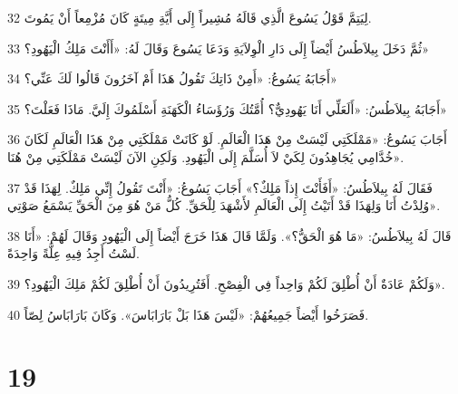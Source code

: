 \par 32 لِيَتِمَّ قَوْلُ يَسُوعَ الَّذِي قَالَهُ مُشِيراً إِلَى أَيَّةِ مِيتَةٍ كَانَ مُزْمِعاً أَنْ يَمُوتَ.
\par 33 ثُمَّ دَخَلَ بِيلاَطُسُ أَيْضاً إِلَى دَارِ الْوِلاَيَةِ وَدَعَا يَسُوعَ وَقَالَ لَهُ: «أَأَنْتَ مَلِكُ الْيَهُودِ؟»
\par 34 أَجَابَهُ يَسُوعُ: «أَمِنْ ذَاتِكَ تَقُولُ هَذَا أَمْ آخَرُونَ قَالُوا لَكَ عَنِّي؟»
\par 35 أَجَابَهُ بِيلاَطُسُ: «أَلَعَلِّي أَنَا يَهُودِيٌّ؟ أُمَّتُكَ وَرُؤَسَاءُ الْكَهَنَةِ أَسْلَمُوكَ إِلَيَّ. مَاذَا فَعَلْتَ؟»
\par 36 أَجَابَ يَسُوعُ: «مَمْلَكَتِي لَيْسَتْ مِنْ هَذَا الْعَالَمِ. لَوْ كَانَتْ مَمْلَكَتِي مِنْ هَذَا الْعَالَمِ لَكَانَ خُدَّامِي يُجَاهِدُونَ لِكَيْ لاَ أُسَلَّمَ إِلَى الْيَهُودِ. وَلَكِنِ الآنَ لَيْسَتْ مَمْلَكَتِي مِنْ هُنَا».
\par 37 فَقَالَ لَهُ بِيلاَطُسُ: «أَفَأَنْتَ إِذاً مَلِكٌ؟» أَجَابَ يَسُوعُ: «أَنْتَ تَقُولُ إِنِّي مَلِكٌ. لِهَذَا قَدْ وُلِدْتُ أَنَا وَلِهَذَا قَدْ أَتَيْتُ إِلَى الْعَالَمِ لأَشْهَدَ لِلْحَقِّ. كُلُّ مَنْ هُوَ مِنَ الْحَقِّ يَسْمَعُ صَوْتِي».
\par 38 قَالَ لَهُ بِيلاَطُسُ: «مَا هُوَ الْحَقُّ؟». وَلَمَّا قَالَ هَذَا خَرَجَ أَيْضاً إِلَى الْيَهُودِ وَقَالَ لَهُمْ: «أَنَا لَسْتُ أَجِدُ فِيهِ عِلَّةً وَاحِدَةً.
\par 39 وَلَكُمْ عَادَةٌ أَنْ أُطْلِقَ لَكُمْ وَاحِداً فِي الْفِصْحِ. أَفَتُرِيدُونَ أَنْ أُطْلِقَ لَكُمْ مَلِكَ الْيَهُودِ؟».
\par 40 فَصَرَخُوا أَيْضاً جَمِيعُهُمْ: «لَيْسَ هَذَا بَلْ بَارَابَاسَ». وَكَانَ بَارَابَاسُ لِصّاً.

\chapter{19}

